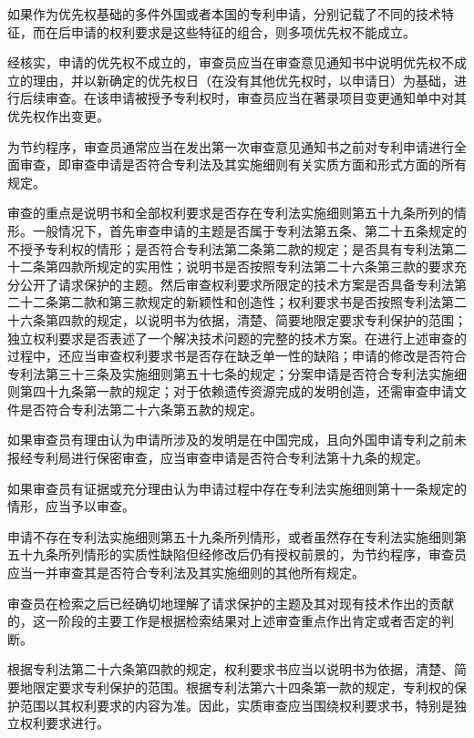 如果作为优先权基础的多件外国或者本国的专利申请，分别记载了不同的技术特征，而在后申请的权利要求是这些特征的组合，则多项优先权不能成立。

经核实，申请的优先权不成立的，审查员应当在审查意见通知书中说明优先权不成立的理由，并以新确定的优先权日（在没有其他优先权时，以申请日）为基础，进行后续审查。在该申请被授予专利权时，审查员应当在著录项目变更通知单中对其优先权作出变更。

为节约程序，审查员通常应当在发出第一次审查意见通知书之前对专利申请进行全面审查，即审查申请是否符合专利法及其实施细则有关实质方面和形式方面的所有规定。

审查的重点是说明书和全部权利要求是否存在专利法实施细则第五十九条所列的情形。一般情况下，首先审查申请的主题是否属于专利法第五条、第二十五条规定的不授予专利权的情形；是否符合专利法第二条第二款的规定；是否具有专利法第二十二条第四款所规定的实用性；说明书是否按照专利法第二十六条第三款的要求充分公开了请求保护的主题。然后审查权利要求所限定的技术方案是否具备专利法第二十二条第二款和第三款规定的新颖性和创造性；权利要求书是否按照专利法第二十六条第四款的规定，以说明书为依据，清楚、简要地限定要求专利保护的范围；独立权利要求是否表述了一个解决技术问题的完整的技术方案。在进行上述审查的过程中，还应当审查权利要求书是否存在缺乏单一性的缺陷；申请的修改是否符合专利法第三十三条及实施细则第五十七条的规定；分案申请是否符合专利法实施细则第四十九条第一款的规定；对于依赖遗传资源完成的发明创造，还需审查申请文件是否符合专利法第二十六条第五款的规定。

如果审查员有理由认为申请所涉及的发明是在中国完成，且向外国申请专利之前未报经专利局进行保密审查，应当审查申请是否符合专利法第十九条的规定。

如果审查员有证据或充分理由认为申请过程中存在专利法实施细则第十一条规定的情形，应当予以审查。

申请不存在专利法实施细则第五十九条所列情形，或者虽然存在专利法实施细则第五十九条所列情形的实质性缺陷但经修改后仍有授权前景的，为节约程序，审查员应当一并审查其是否符合专利法及其实施细则的其他所有规定。

审查员在检索之后已经确切地理解了请求保护的主题及其对现有技术作出的贡献的，这一阶段的主要工作是根据检索结果对上述审查重点作出肯定或者否定的判断。

根据专利法第二十六条第四款的规定，权利要求书应当以说明书为依据，清楚、简要地限定要求专利保护的范围。根据专利法第六十四条第一款的规定，专利权的保护范围以其权利要求的内容为准。因此，实质审查应当围绕权利要求书，特别是独立权利要求进行。

